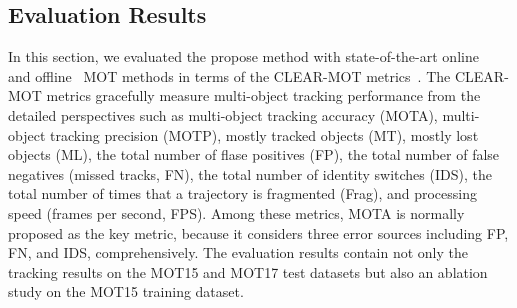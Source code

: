 \documentclass[journal]{IEEEtran}
\newcounter{ct}
\begin{document}
\subsection{Evaluation Results}

In this section, we evaluated the propose method with state-of-the-art online~\cite{bae2,ham,fu1,mdp,tbss,scea,eamtt,rmot,prev1,gscr,bae1,motdt,dman,mtdf,amadm,gmphdn1tr,gmphdkcf,gmphd2012} and offline~\cite{mhtdam,cnntcm,siameseCNN,nomt,elp,jpdam,moticon,segtrack,cem,smot,dpnms,mhtlstm,ehaf,fwt,jcc,tlmht,edmt,iou} MOT methods in terms of the CLEAR-MOT metrics~\cite{clearmot}. The CLEAR-MOT metrics gracefully measure multi-object tracking performance from the detailed perspectives such as multi-object tracking accuracy (MOTA),  multi-object tracking precision (MOTP), mostly tracked objects (MT), mostly lost objects (ML), the total number of flase positives (FP), the total number of false negatives (missed tracks, FN), the total number of identity switches (IDS), the total number of times that a trajectory is fragmented (Frag), and processing speed (frames per second, FPS). Among these metrics, MOTA is normally proposed as the key metric, because it considers three error sources including FP, FN, and IDS, comprehensively.
The evaluation results contain not only the tracking results on the MOT15 and MOT17 test datasets but also an ablation study on the MOT15 training dataset. 
\end{document}
